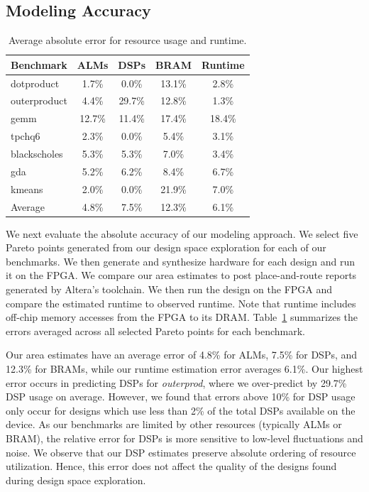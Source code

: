 \subsection{Modeling Accuracy}

\begin{table}
\centering\footnotesize
\begin{tabular}{lcccc}
\toprule

{\bf Benchmark} & {\bf ALMs} & {\bf DSPs} & {\bf BRAM} & {\bf Runtime} \\ \midrule
dotproduct      & 1.7\%      & 0.0\%      & 13.1\%      & 2.8\%  \\ \midrule
outerproduct    & 4.4\%      & 29.7\%     & 12.8\%      & 1.3\%  \\ \midrule
gemm            & 12.7\%     & 11.4\%     & 17.4\%      & 18.4\% \\ \midrule
tpchq6          & 2.3\%      & 0.0\%      & 5.4\%       & 3.1\%  \\ \midrule
blackscholes    & 5.3\%      & 5.3\%      & 7.0\%       & 3.4\%  \\ \midrule
gda             & 5.2\%      & 6.2\%      & 8.4\%       & 6.7\%  \\ \midrule
kmeans          & 2.0\%      & 0.0\%      & 21.9\%      & 7.0\%  \\ \midrule \midrule

Average         & 4.8\%      & 7.5\%     & 12.3\%      & 6.1\%   \\ \bottomrule
\end{tabular}
\caption{Average absolute error for resource usage and runtime.}
\label{t:errors}
\end{table}

We next evaluate the absolute accuracy of our modeling approach. We select five Pareto points generated from our design space exploration for each of our benchmarks. We then generate and synthesize hardware for each design and run it on the FPGA. We compare our area estimates to post place-and-route reports generated by Altera's toolchain. We then run the design on the FPGA and compare the estimated runtime to observed runtime. Note that runtime includes off-chip memory accesses from the FPGA to its DRAM. Table~\ref{t:errors} summarizes the errors averaged across all selected Pareto points for each benchmark.

Our area estimates have an average error of 4.8\% for ALMs, 7.5\% for DSPs, and 12.3\% for BRAMs, while our runtime estimation error averages 6.1\%.
Our highest error occurs in predicting DSPs for \emph{outerprod}, where we over-predict by 29.7\% DSP usage on average.
However, we found that errors above 10\% for DSP usage only occur for designs which use less than 2\% of the total DSPs available on the device.
As our benchmarks are limited by other resources (typically ALMs or BRAM), the relative error for DSPs is more sensitive
to low-level fluctuations and noise. We observe that our DSP estimates preserve absolute ordering of resource utilization. Hence, this error does not
affect the quality of the designs found during design space exploration.%

